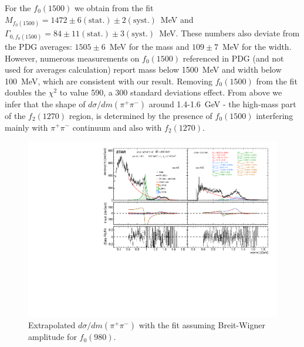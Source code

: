 For the $f_0(1500)$ we obtain from the fit $M_{f_0(1500)}=1472 \pm 6 (\text{stat.}) \pm 2 (\text{syst.})$~MeV and $\Gamma_{0,f_0(1500)} = 84 \pm 11 (\text{stat.}) \pm 3 (\text{syst.})$~MeV. These numbers also deviate from the PDG averages: $1505\pm 6$~MeV for the mass and $109\pm 7$~MeV for the width. However, numerous measurements on $f_{0}(1500)$ referenced in PDG (and not used for averages calculation) report mass below 1500~MeV and width below 100~MeV, which are consistent with our result. Removing $f_0(1500)$ from the fit doubles the $\chi^2$ to value 590, a 300 standard deviations effect. From above we infer that the shape of $d\sigma/dm(\pi^{+}\pi^{-})$ around 1.4-1.6~GeV - the high-mass part of the $f_{2}(1270)$ region, is determined by the presence of $f_0(1500)$ interfering mainly with $\pi^{+}\pi^{-}$ continuum and also with $f_{2}(1270)$.
%

\begin{figure}%
\centering
\includegraphics[width=\textwidth,page=1]{graphics/physicsResults/InvMassFit/F0980_BREITWIGNER/RatioAndInterference_PiPiInvMass_Fit.pdf}
%
\caption{Extrapolated $d\sigma/dm(\pi^{+}\pi^{-})$ with the fit assuming Breit-Wigner amplitude for $f_{0}(980)$.}
\label{invMassFit_F0980_BREITWIGNER}
\end{figure}

